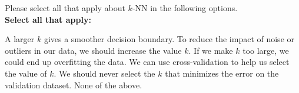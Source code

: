 \documentclass[11pt,addpoints,answers]{exam}
\numberwithin{equation}{section} %
\numberwithin{figure}{section} %
\numberwithin{table}{section} %
\begin{document}
\begin{questions}
    

    \question[3] Please select all that apply about $k$-NN in the following options. \\ \textbf{Select all that apply:}
    {
    \checkboxchar{$\Box$} \checkedchar{$\blacksquare$}
    \begin{checkboxes}
        \choice A larger $k$ gives a smoother decision boundary.
        \choice To reduce the impact of noise or outliers in our data, we should increase the value $k$.
        \choice If we make $k$ too large, we could end up overfitting the data.
        \choice We can use cross-validation to help us select the value of $k$.
        \choice We should never select the $k$ that minimizes the error on the validation dataset.
        \choice None of the above.
    \end{checkboxes}
    }

    
    
    \clearpage
\end{questions}
\end{document}
